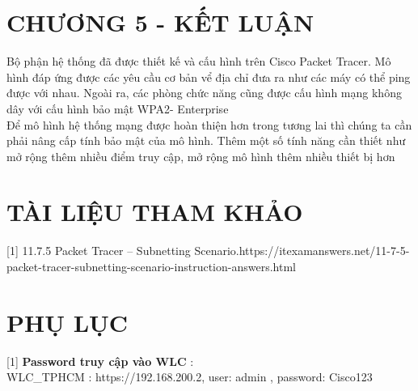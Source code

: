 \documentclass[12pt,a4paper]{report}
\begin{document}
\section*{CHƯƠNG 5 - KẾT LUẬN}
\hspace*{0.25cm}Bộ phận hệ thống đã được thiết kế và cấu hình trên Cisco Packet Tracer. Mô hình đáp ứng được các yêu cầu cơ bản vể địa chỉ đưa ra như các máy có thể ping được với nhau. Ngoài ra, các phòng chức năng cũng được cấu hình mạng không dây với cấu hình bảo mật WPA2- Enterprise\\
\hspace*{1cm}Để mô hình hệ thống mạng được hoàn thiện hơn trong tương lai thì chúng ta cần phải nâng cấp tính bảo mật của mô hình. Thêm một số tính năng cần thiết như mở rộng thêm nhiều điểm truy cập, mở rộng mô hình thêm nhiều thiết bị hơn
\cleardoublepage

\section*{TÀI LIỆU THAM KHẢO}
\hspace*{0.25cm}[1] 11.7.5 Packet Tracer – Subnetting Scenario.https://itexamanswers.net/11-7-5-packet-tracer-subnetting-scenario-instruction-answers.html\\
\cleardoublepage

\section*{PHỤ LỤC}
\hspace*{1cm}[1] \textbf{Password truy cập vào WLC } :\\
\hspace*{2cm} WLC\_TPHCM : https://192.168.200.2, user: admin , password: Cisco123\\
\cleardoublepage
\end{document}
